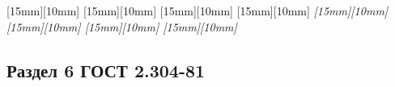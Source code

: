 {
  {
    \DrawChars{\textAlpha \textBeta \textGamma \textDelta \textEpsilon \textZeta \textEta \textTheta \textIota \textKappa \textLambda \textMu \textNu}[15mm][10mm]
    \DrawChars{\textXi \textOmicron \textPi \textRho \textSigma \textTau \textUpsilon \textPhi \textChi \textPsi \textOmega}[15mm][10mm]
    \DrawChars{\textalpha \textbeta \textgamma \textdelta \textepsilon \textzeta \texteta \texttheta \textiota \textkappa \textlambda \textmu}[15mm][10mm]
    \DrawChars{\textnu \textxi \textomicron \textpi \textrho \textsigma \texttau \textupsilon \textphi \textchi \textpsi \textomega}[15mm][10mm]
  }
  {
    \slshape
    \DrawChars{\textAlpha \textBeta \textGamma \textDelta \textEpsilon \textZeta \textEta \textTheta \textIota \textKappa \textLambda \textMu \textNu}[15mm][10mm]
    \DrawChars{\textXi \textOmicron \textPi \textRho \textSigma \textTau \textUpsilon \textPhi \textChi \textPsi \textOmega}[15mm][10mm]
    \DrawChars{\textalpha \textbeta \textgamma \textdelta \textepsilon \textzeta \texteta \texttheta \textiota \textkappa \textlambda \textmu \textnu}[15mm][10mm]
    \DrawChars{\textxi \textomicron \textpi \textrho \textsigma \texttau \textupsilon \textphi \textchi \textpsi \textomega}[15mm][10mm]
  }
}

\iffalse %
\newpage
\subsubsection{Математические греческие символы}

{
  {
    \DrawChars{\Alpha \Beta \Gamma \Delta \Epsilon \Zeta \Eta \Theta \Iota \Kappa \Lambda \Mu \Nu \Xi}
    \DrawChars{\Omicron \Pi \Rho \Sigma \Tau \Upsilon \Phi \Chi \Psi \Omega}
    \DrawChars{\alpha \beta \gamma \delta \epsilon \zeta \eta \theta \iota \kappa \lambda \mu \nu}[20mm]
    \DrawChars{\xi \omicron \pi \rho \sigma \tau \upsilon \phi \chi \psi \omega}[20mm]
  }
  {
    \slshape
    \DrawChars{\Alpha \Beta \Gamma \Delta \Epsilon \Zeta \Eta \Theta \Iota \Kappa \Lambda \Mu \Nu \Xi \Omicron}
    \DrawChars{\Pi \Rho \Sigma \Tau \Upsilon \Phi \Chi \Psi \Omega}
    \DrawChars{\alpha \beta \gamma \delta \epsilon \zeta \eta \theta \iota \kappa \lambda \mu \nu \xi \omicron}[20mm]
    \DrawChars{\pi \rho \sigma \tau \upsilon \phi \chi \psi \omega}[20mm]
  }
}
\fi

\newpage
\subsection{Раздел 6 ГОСТ 2.304-81}
\makeatletter

